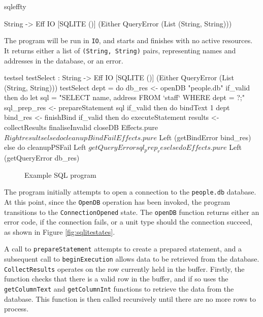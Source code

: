 \noindent
\begin{SaveVerbatim}{sqleffty}

String -> Eff IO [SQLITE ()] 
           (Either QueryError (List (String, String)))

\end{SaveVerbatim}

\noindent
The program will be run in \texttt{IO}, and starts and finishes with no active
resources.  It returns either a list of \texttt{(String, String)} pairs,
representing names and addresses in the database, or an error.

\begin{SaveVerbatim}{testsel}
testSelect : String -> Eff IO [SQLITE ()] 
             (Either QueryError (List (String, String)))
testSelect dept = do
  db_res <- openDB "people.db"
  if_valid then do
    let sql = "SELECT name, address FROM `staff` 
                    WHERE dept = ?;"
    sql_prep_res <- prepareStatement sql
    if_valid then do 
      bindText 1 dept
      bind_res <- finishBind
      if_valid then do
        executeStatement
        results <- collectResults
        finaliseInvalid
        closeDB
        Effects.pure $ Right results
      else do
        cleanupBindFail
        Effects.pure $ Left (getBindError bind_res)
    else do
      cleanupPSFail
      Left $ getQueryError sql_prep_res
  else do 
    Effects.pure $ Left (getQueryError db_res)
\end{SaveVerbatim}

\begin{figure}[h]
\caption{Example SQL program}
\label{fig:testsel}
\end{figure}

The program initially attempts to open a connection to the \texttt{people.db}
database. At this point, since the \texttt{OpenDB} operation has been invoked,
the program transitions to the \texttt{ConnectionOpened} state. The
\texttt{openDB} function returns either an error code, if the connection fails, or a unit type should the connection succeed, as shown in Figure \ref{fig:sqlitestates}.

A call to \texttt{prepareStatement} attempts to create a prepared statement,
and a subsequent call to \texttt{beginExecution} allows data to be retrieved
from the database.
%
\texttt{CollectResults} operates on the row currently held in the buffer.
Firstly, the function checks
that there is a valid row in the buffer, and if so uses the
\texttt{getColumnText} and \texttt{getColumnInt} functions to retrieve the data
from the database. This function is then called recursively until there are no
more rows to process.

